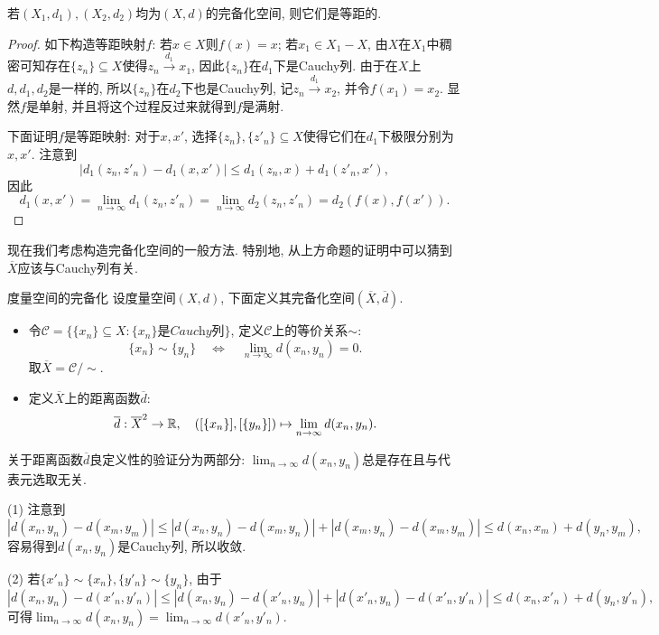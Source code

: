 \begin{proposition}{}
	若$(X_1,d_1),(X_2,d_2)$均为$(X,d)$的完备化空间, 则它们是等距的. 
\end{proposition}
\begin{proof}
	如下构造等距映射$f$: 若$x \in X$则$f(x) = x$; 若$x_1 \in X_1-X$, 由$X$在$X_1$中稠密可知存在$\{ z_n \} \subseteq X$使得$z_n \stackrel{d_1}{\longrightarrow} x_1$, 因此$\{ z_n \}$在$d_1$下是Cauchy列. 由于在$X$上$d,d_1,d_2$是一样的, 所以$\{ z_n \}$在$d_2$下也是Cauchy列, 记$z_n \stackrel{d_1}{\longrightarrow} x_2$, 并令$f(x_1)=x_2$. 显然$f$是单射, 并且将这个过程反过来就得到$f$是满射. 
	
	下面证明$f$是等距映射: 对于$x,x'$, 选择$\{ z_n \},\{ z'_n \} \subseteq X$使得它们在$d_1$下极限分别为$x,x'$. 注意到$$|d_1(z_n,z'_n)-d_1(x,x')| \leq d_1(z_n,x) + d_1(z'_n,x'),$$
	因此$$d_1(x,x') = \lim_{n\to \infty} d_1(z_n,z'_n) = \lim_{n\to \infty} d_2(z_n,z'_n) = d_2(f(x),f(x')).$$
\end{proof}

现在我们考虑构造完备化空间的一般方法. 特别地, 从上方命题的证明中可以猜到$\overline{X}$应该与Cauchy列有关. 

\begin{definition}{度量空间的完备化}
	设度量空间$(X,d)$, 下面定义其完备化空间$(\overline{X},\overline{d})$. 
	
	\begin{itemize}
		\item 令$\mathcal{C} = \{ \{ x_n \} \subseteq X: \textit{$\{ x_n \}$是Cauchy列} \}$, 定义$\mathcal{C}$上的等价关系$\sim$: $$\{ x_n \} \sim \{ y_n \} \quad \Leftrightarrow \quad \lim_{n\to \infty} d(x_n,y_n)=0.$$
		取$\overline{X} = \mathcal{C} / \sim$. 
		\item 定义$\overline{X}$上的距离函数$\overline{d}$: $$\overline{d} : \overline{X}^2 \to \mathbb{R},\quad ([\{ x_n \}], [\{ y_n \}]) \mapsto \lim_{n\to \infty} d(x_n,y_n). $$
	\end{itemize}
\end{definition}
\begin{remark}
	关于距离函数$\overline{d}$良定义性的验证分为两部分: $\lim_{n\to \infty} d(x_n,y_n)$总是存在且与代表元选取无关. 
	
	(1) 注意到$$|d(x_n,y_n) - d(x_m,y_m)| \leq |d(x_n,y_n)-d(x_m,y_n)|+|d(x_m,y_n)-d(x_m,y_m)| \leq d(x_n,x_m)+d(y_n,y_m), $$
	容易得到$d(x_n,y_n)$是Cauchy列, 所以收敛. 
	
	(2) 若$\{ x'_n \} \sim \{ x_n \}, \{ y'_n \} \sim \{ y_n \}$, 由于$$|d(x_n,y_n) - d(x'_n,y'_n)| \leq |d(x_n,y_n) - d(x'_n,y_n)| + |d(x'_n,y_n) - d(x'_n,y'_n)| \leq d(x_n,x'_n) + d(y_n,y'_n), $$
	可得$\lim_{n\to \infty} d(x_n,y_n) = \lim_{n\to \infty} d(x'_n,y'_n)$. 
\end{remark}

